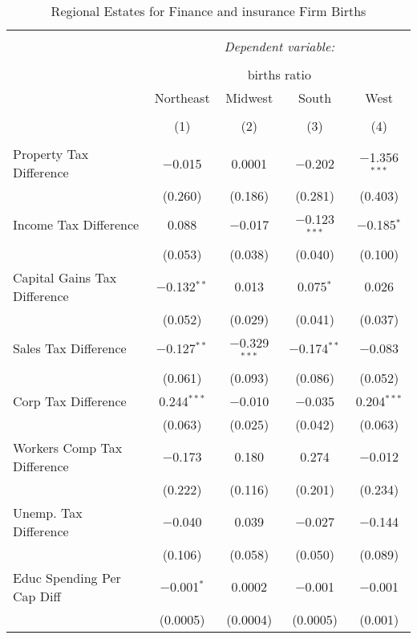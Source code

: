 
\begin{table}[!htbp] \centering 
  \caption{Regional Estates for  Finance and insurance Firm Births} 
  \label{} 
\begin{tabular}{@{\extracolsep{5pt}}lcccc} 
\\[-1.8ex]\hline 
\hline \\[-1.8ex] 
 & \multicolumn{4}{c}{\textit{Dependent variable:}} \\ 
\cline{2-5} 
\\[-1.8ex] & \multicolumn{4}{c}{births ratio} \\ 
 & Northeast & Midwest & South & West \\ 
\\[-1.8ex] & (1) & (2) & (3) & (4)\\ 
\hline \\[-1.8ex] 
 Property Tax Difference & $-$0.015 & 0.0001 & $-$0.202 & $-$1.356$^{***}$ \\ 
  & (0.260) & (0.186) & (0.281) & (0.403) \\ 
  Income Tax Difference & 0.088 & $-$0.017 & $-$0.123$^{***}$ & $-$0.185$^{*}$ \\ 
  & (0.053) & (0.038) & (0.040) & (0.100) \\ 
  Capital Gains Tax Difference & $-$0.132$^{**}$ & 0.013 & 0.075$^{*}$ & 0.026 \\ 
  & (0.052) & (0.029) & (0.041) & (0.037) \\ 
  Sales Tax Difference & $-$0.127$^{**}$ & $-$0.329$^{***}$ & $-$0.174$^{**}$ & $-$0.083 \\ 
  & (0.061) & (0.093) & (0.086) & (0.052) \\ 
  Corp Tax Difference & 0.244$^{***}$ & $-$0.010 & $-$0.035 & 0.204$^{***}$ \\ 
  & (0.063) & (0.025) & (0.042) & (0.063) \\ 
  Workers Comp Tax Difference & $-$0.173 & 0.180 & 0.274 & $-$0.012 \\ 
  & (0.222) & (0.116) & (0.201) & (0.234) \\ 
  Unemp. Tax Difference & $-$0.040 & 0.039 & $-$0.027 & $-$0.144 \\ 
  & (0.106) & (0.058) & (0.050) & (0.089) \\ 
  Educ Spending Per Cap Diff & $-$0.001$^{*}$ & 0.0002 & $-$0.001 & $-$0.001 \\ 
  & (0.0005) & (0.0004) & (0.0005) & (0.001) \\ 

\end{tabular}
\end{table}
